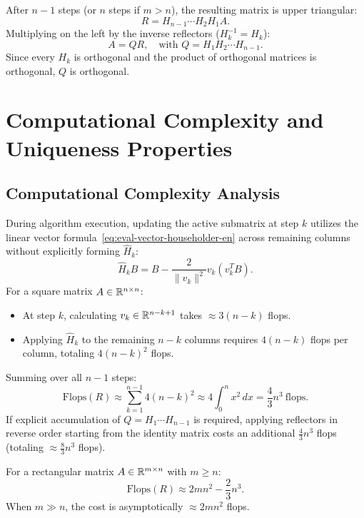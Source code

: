 After $n-1$ steps (or $n$ steps if $m > n$), the resulting matrix is upper triangular:
\begin{equation}
    R = H_{n-1} \cdots H_2 H_1 A.
\end{equation}
Multiplying on the left by the inverse reflectors ($H_k^{-1} = H_k$):
\begin{equation}
    A = Q R, \quad \text{with } Q = H_1 H_2 \cdots H_{n-1}.
\end{equation}
Since every $H_k$ is orthogonal and the product of orthogonal matrices is orthogonal, $Q$ is orthogonal.

\FloatBarrier
\section{Computational Complexity and Uniqueness Properties}
\label{sec:complexity-uniqueness-qr-en}

\subsection{Computational Complexity Analysis}
During algorithm execution, updating the active submatrix at step $k$ utilizes the linear vector formula~\eqref{eq:eval-vector-householder-en} across remaining columns without explicitly forming $\hat{H}_k$:
\begin{equation}
    \hat{H}_k B = B - \frac{2}{\|v_k\|^2} v_k (v_k^T B).
\end{equation}
For a square matrix $A \in \mathbb{R}^{n \times n}$:
\begin{itemize}
    \item At step $k$, calculating $v_k \in \mathbb{R}^{n-k+1}$ takes $\approx 3(n-k)$ flops.
    \item Applying $\hat{H}_k$ to the remaining $n - k$ columns requires $4(n-k)$ flops per column, totaling $4(n-k)^2$ flops.
\end{itemize}
Summing over all $n-1$ steps:
\begin{equation}
    \text{Flops}(R) \approx \sum_{k=1}^{n-1} 4(n-k)^2 \approx 4 \int_0^n x^2 \, dx = \frac{4}{3} n^3 \ \text{flops}.
\end{equation}
If explicit accumulation of $Q = H_1 \cdots H_{n-1}$ is required, applying reflectors in reverse order starting from the identity matrix costs an additional $\frac{4}{3} n^3$ flops (totaling $\approx \frac{8}{3} n^3$ flops).

For a rectangular matrix $A \in \mathbb{R}^{m \times n}$ with $m \ge n$:
\begin{equation}
    \text{Flops}(R) \approx 2 m n^2 - \frac{2}{3} n^3.
\end{equation}
When $m \gg n$, the cost is asymptotically $\approx 2 m n^2$ flops.

